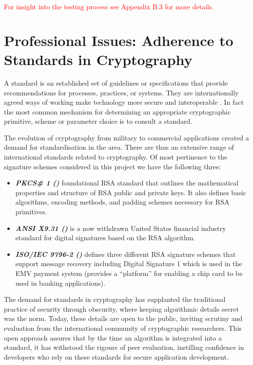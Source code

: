 \documentclass[]{final_report}
\theoremstyle{definition}
\begin{document}
\textcolor{red} {For insight into the testing process see Appendix B.3 for more details.}

\chapter{Professional Issues: Adherence to Standards in Cryptography}



A standard is an established set of guidelines or specifications that provide recommendations for processes, practices, or systems. They are internationally agreed ways of working make technology more secure and interoperable \cite{isoCryptography2024}. In fact the most common mechanism for determining an appropriate cryptographic primitive, scheme or parameter choice is to consult a standard. 

The evolution of cryptography from military to commercial applications created a demand for standardisation in the area. There are thus an extensive range of international standards related to cryptography.  Of most pertinence to the signature schemes considered in this project we have the following three:
\begin{itemize}

\item \textit{\textbf{PKCS\# 1 (\cite{rfc8017})}} 
foundational RSA standard that outlines the mathematical properties and structure of RSA public and private keys. It also defines basic algorithms, encoding methods, and padding schemes necessary for RSA primitives.
\item \textit{\textbf{ANSI X9.31 (\cite{ANSI-1998-X9-31})}} is a now withdrawn United States financial industry standard for digital signatures based on the RSA algorithm.
\item \textit{\textbf{ISO/IEC 9796-2 (\cite{ISO/2010/9796-2-2010})}} defines three different RSA signature schemes that support message recovery including Digital Signature 1 which is used in the EMV payment system (provides a “platform” for enabling a chip card to be used in banking applications).
\end{itemize}

The demand for standards in cryptography has supplanted the traditional practice of security through obscurity, where keeping algorithmic details secret was the norm. Today, these details are open to the public, inviting scrutiny and evaluation from the international community of cryptographic researchers. This open approach assures that by the time an algorithm is integrated into a standard, it has withstood the rigours of peer evaluation, instilling confidence in developers who rely on these standards for secure application development.
\end{document}
